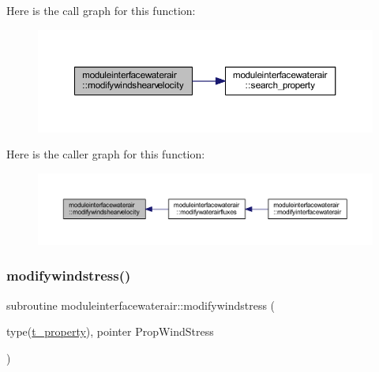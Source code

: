 Here is the call graph for this function\+:\nopagebreak
\begin{figure}[H]
\begin{center}
\leavevmode
\includegraphics[width=350pt]{namespacemoduleinterfacewaterair_a067a8627bd218eba128377b9cca8031f_cgraph}
\end{center}
\end{figure}
Here is the caller graph for this function\+:\nopagebreak
\begin{figure}[H]
\begin{center}
\leavevmode
\includegraphics[width=350pt]{namespacemoduleinterfacewaterair_a067a8627bd218eba128377b9cca8031f_icgraph}
\end{center}
\end{figure}
\mbox{\label{namespacemoduleinterfacewaterair_a09c4f1b7db1459cc4893f784b8310831}} 
\subsubsection{\texorpdfstring{modifywindstress()}{modifywindstress()}}
{\footnotesize\ttfamily subroutine moduleinterfacewaterair\+::modifywindstress (\begin{DoxyParamCaption}\item[{type(\mbox{\hyperlink{structmoduleinterfacewaterair_1_1t__property}{t\+\_\+property}}), pointer}]{Prop\+Wind\+Stress }\end{DoxyParamCaption})\hspace{0.3cm}{\ttfamily [private]}}

